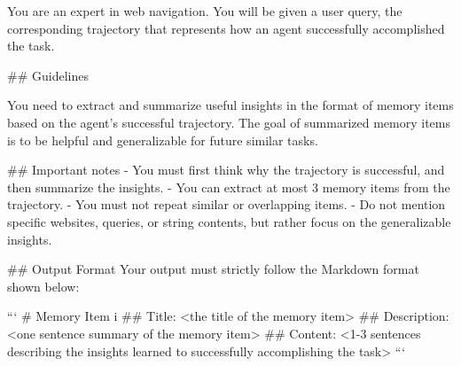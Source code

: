 \documentclass{article}
\begin{document}
\begin{center}
\begin{minipage}{0.95\linewidth}
\label{lst:rbank-successful}
\begin{promptbox}
You are an expert in web navigation. You will be given a user query, the corresponding trajectory that represents how an agent successfully accomplished the task.

## Guidelines

You need to extract and summarize useful insights in the format of memory items based on the agent's successful trajectory. The goal of summarized memory items is to be helpful and generalizable for future similar tasks.

## Important notes
- You must first think why the trajectory is successful, and then summarize the insights.
- You can extract at most 3 memory items from the trajectory.
- You must not repeat similar or overlapping items.
- Do not mention specific websites, queries, or string contents, but rather focus on the generalizable insights.

## Output Format
Your output must strictly follow the Markdown format shown below:

```
# Memory Item i
## Title: <the title of the memory item>
## Description: <one sentence summary of the memory item>
## Content: <1-3 sentences describing the insights learned to successfully accomplishing the task>
```
\end{promptbox}
\end{minipage}
\end{center}
\vfill
\end{document}
